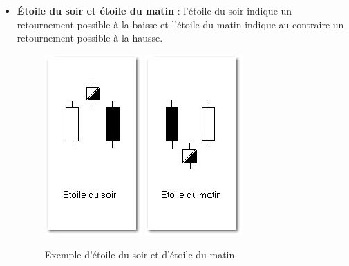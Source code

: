 \begin{itemize}
\item \textbf{Étoile du soir et étoile du matin} : l’étoile du soir indique un retournement possible à la baisse et l’étoile du matin indique au contraire un retournement possible à la hausse.
\begin{figure}[H]
  \center
  \includegraphics[scale=0.5]{../graph/chandelier7.png}
  \includegraphics[scale=0.5]{../graph/chandelier8.png}
  \caption{Exemple d'étoile du soir et d'étoile du matin}
\end{figure} 


\end{itemize}
